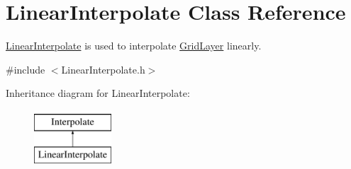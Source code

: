 \hypertarget{classLinearInterpolate}{\section{\-Linear\-Interpolate \-Class \-Reference}
\label{classLinearInterpolate}
}


\hyperlink{classLinearInterpolate}{\-Linear\-Interpolate} is used to interpolate \hyperlink{classGridLayer}{\-Grid\-Layer} linearly.  




{\ttfamily \#include $<$\-Linear\-Interpolate.\-h$>$}

\-Inheritance diagram for \-Linear\-Interpolate\-:\begin{figure}[H]
\begin{center}
\leavevmode
\includegraphics[height=2.000000cm]{classLinearInterpolate}
\end{center}
\end{figure}
